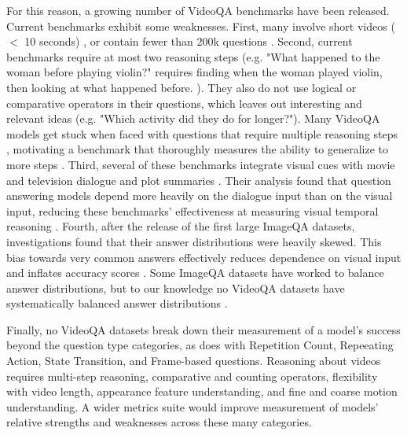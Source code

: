 \documentclass{article}
\newcommand{\mgm}[1]{{\color{cyan}{mgm: #1}}}
\begin{document}
For this reason, a growing number of VideoQA benchmarks have been released. Current benchmarks exhibit some weaknesses. First, many involve short videos ($<$ 10 seconds) \cite{jang2017tgif, kim2017deepstory, xu2017video, maharaj2017dataset}, or contain fewer than 200k questions \mgm{what counts as small?} \cite{tapaswi2016movieqa, lei2018tvqa, kim2017deepstory, xu2017video, jang2017tgif, yu2019activitynet, zeng2016leveraging}. Second, current benchmarks require at most two reasoning steps (e.g. "What happened to the woman before playing violin?" requires finding when the woman played violin, then looking at what happened before. \cite{yu2019activitynet}). They also do not use logical or comparative operators in their questions, which leaves out interesting and relevant ideas (e.g. "Which activity did they do for longer?"). Many VideoQA models get stuck when faced with questions that require multiple reasoning steps \cite{fan2019heterogeneous}, motivating a benchmark that thoroughly measures the ability to generalize to more steps \mgm{rephrase last part}. Third, several of these benchmarks integrate visual cues with movie and television dialogue and plot summaries \cite{lei2018tvqa, tapaswi2016movieqa, kim2017deepstory}. Their analysis found that question answering models depend more heavily on the dialogue input than on the visual input, reducing these benchmarks' effectiveness at measuring visual temporal reasoning \cite{tapaswi2016movieqa, lei2018tvqa}. Fourth, after the release of the first large ImageQA datasets, investigations found that their answer distributions were heavily skewed. This bias towards very common answers effectively reduces dependence on visual input and inflates accuracy scores \cite{goyal2017making, hudson2019gqa}. Some ImageQA datasets have worked to balance answer distributions, but to our knowledge no VideoQA datasets have systematically balanced answer distributions \cite{goyal2017making, hudson2019gqa}. 

\mgm{Is this a useful thing to include: Few questions in existing benchmarks focus specifically on object manipulation through videos.} 

Finally, no VideoQA datasets break down their measurement of a model's success beyond the question type categories, as \cite{jang2017tgif} does with Repetition Count, Repeeating Action, State Transition, and Frame-based questions. Reasoning about videos requires multi-step reasoning, comparative and counting operators, flexibility with video length, appearance feature understanding, and fine and coarse motion understanding. A wider metrics suite would improve measurement of models' relative strengths and weaknesses across these many categories.
\end{document}
